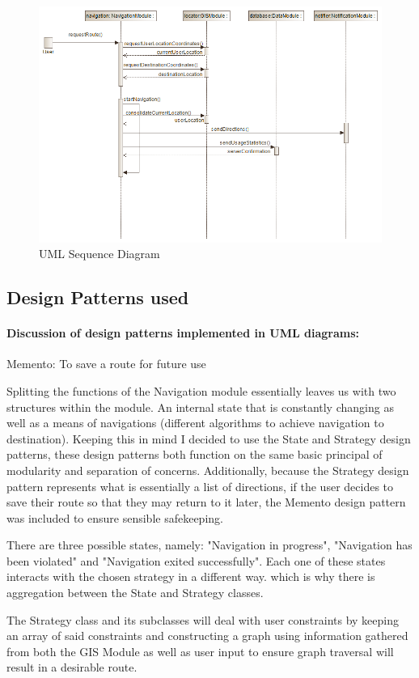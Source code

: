 \documentclass[a4paper,12pt]{article}
\begin{document}
	\begin{figure}
	  \includegraphics[width=\linewidth]{NavigationModuleSequenceDiagram.png}
	  \caption{UML Sequence Diagram}
	  \label{fig:UML5}
	\end{figure}


	
	\subsection{Design Patterns used}
	\paragraph{Discussion of design patterns implemented in UML diagrams:}
		Memento: To save a route for future use
		
		Splitting the functions of the Navigation module essentially leaves us with two structures within the module. An internal state that is constantly changing as well as a means of navigations (different algorithms to achieve navigation to destination). Keeping this in mind I decided to use the State and Strategy design patterns, these design patterns both function on the same basic principal of modularity and separation of concerns. Additionally, because the Strategy design pattern represents what is essentially a list of directions, if the user decides to save their route so that they may return to it later, the Memento design pattern was included to ensure sensible safekeeping.
		
		There are three possible states, namely: "Navigation in progress", "Navigation has been violated" and "Navigation exited successfully". Each one of these states interacts with the chosen strategy in a different way. which is why there is aggregation between the State and Strategy classes.
		
		The Strategy class and its subclasses will deal with user constraints by keeping an array of said constraints and constructing a graph using information gathered from both the GIS Module as well as user input to ensure graph traversal will result in a desirable route. 
	
\end{document}

